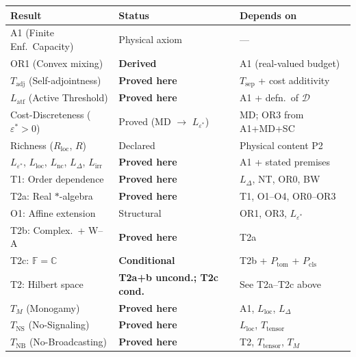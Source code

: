 \documentclass[11pt]{article}
\theoremstyle{remark}
\begin{document}
\begin{center}
\small
{}
\smallskip
{\footnotesize
\begin{tabular*}{\textwidth}{@{\extracolsep{\fill}}lll@{}}
\toprule
\textbf{Result} & \textbf{Status} & \textbf{Depends on} \\
\midrule
A1 (Finite Enf.\ Capacity) & Physical axiom & --- \\
OR1 (Convex mixing) & \textbf{Derived} & A1 (real-valued budget) \\
$T_{\mathrm{adj}}$ (Self-adjointness) & \textbf{Proved here} & $T_{\mathrm{sep}}$ + cost additivity \\
$L_{\mathrm{atf}}$ (Active Threshold) & \textbf{Proved here} & A1 + defn.\ of $\mathcal{D}$ \\
Cost-Discreteness ($\varepsilon^*\!>\!0$) & Proved (MD $\to$ $L_{\varepsilon^*}$) & MD; OR3 from A1+MD+SC \\
Richness ($R_{\mathrm{loc}}$, $R$) & Declared & Physical content P2 \\
\midrule
$L_{\varepsilon^*}$, $L_{\mathrm{loc}}$, $L_{\mathrm{nc}}$, $L_\Delta$, $L_{\mathrm{irr}}$ & \textbf{Proved here} & A1 + stated premises \\
T1: Order dependence & \textbf{Proved here} & $L_\Delta$, NT, OR0, BW \\
T2a: Real $*$-algebra & \textbf{Proved here} & T1, O1--O4, OR0--OR3 \\
O1: Affine extension & Structural & OR1, OR3, $L_{\varepsilon^*}$ \\
T2b: Complex.\ + W--A & \textbf{Proved here} & T2a \\
T2c: $\mathbb{F}\!=\!\mathbb{C}$ & \textbf{Conditional} & T2b + $P_{\mathrm{tom}}$ + $P_{\mathrm{cls}}$ \\
T2: Hilbert space & \textbf{T2a+b uncond.; T2c cond.} & See T2a--T2c above \\
\midrule
$T_M$ (Monogamy) & \textbf{Proved here} & A1, $L_{\mathrm{loc}}$, $L_\Delta$ \\
$T_{\mathrm{NS}}$ (No-Signaling) & \textbf{Proved here} & $L_{\mathrm{loc}}$, $T_{\mathrm{tensor}}$ \\
$T_{\mathrm{NB}}$ (No-Broadcasting) & \textbf{Proved here} & T2, $T_{\mathrm{tensor}}$, $T_M$ \\

\end{tabular*}}
\end{center}
\end{document}
